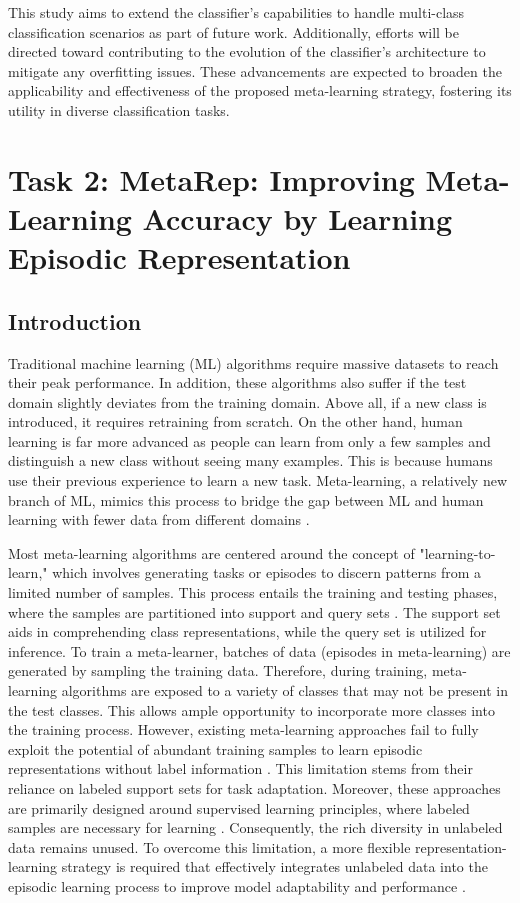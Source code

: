 This study aims to extend the classifier's capabilities to handle multi-class classification scenarios as part of future work. Additionally, efforts will be directed toward contributing to the evolution of the classifier's architecture to mitigate any overfitting issues. These advancements are expected to broaden the applicability and effectiveness of the proposed meta-learning strategy, fostering its utility in diverse classification tasks.

\section{Task 2: MetaRep: Improving Meta-Learning Accuracy by  Learning Episodic Representation}

\subsection{Introduction}

Traditional machine learning (ML) algorithms require massive datasets to reach their peak performance. In addition, these algorithms also suffer if the test domain slightly deviates from the training domain. Above all, if a new class is introduced, it requires retraining from scratch. On the other hand, human learning is far more advanced as people can learn from only a few samples and distinguish a new class without seeing many examples. This is because humans use their previous experience to learn a new task. Meta-learning, a relatively new branch of  ML,  mimics this process to bridge the gap between ML and human learning with fewer data from different domains  \cite{such2017deep}.

Most meta-learning algorithms \cite{vinyals2016matching,li2017meta,nichol2018reptile,setlur2020support} are centered around the concept of "learning-to-learn," which involves generating tasks or episodes to discern patterns from a limited number of samples. This process entails the training and testing phases, where the samples are partitioned into support and query sets \cite{bennequin2021bridging}. The support set aids in comprehending class representations, while the query set is utilized for inference. To train a meta-learner, batches of data (episodes in meta-learning) are generated by sampling the training data. Therefore, during training, meta-learning algorithms are exposed to a variety of classes that may not be present in the test classes. This allows ample opportunity to incorporate more classes into the training process. However, existing meta-learning approaches fail to fully exploit the potential of abundant training samples to learn episodic representations without label information \cite{hospedales2021meta}. This limitation stems from their reliance on labeled support sets for task adaptation. Moreover, these approaches are primarily designed around supervised learning principles, where labeled samples are necessary for learning \cite{zhang2023learning}. Consequently, the rich diversity in unlabeled data remains unused. To overcome this limitation, a more flexible representation-learning strategy is required that effectively integrates unlabeled data into the episodic learning process to improve model adaptability and performance \cite{tian2020rethinking}.

